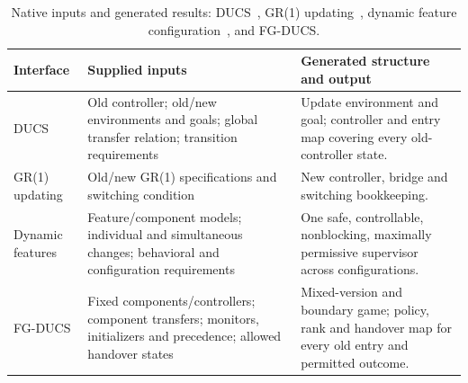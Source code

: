 \begin{table}[!htbp]
\caption{Native inputs and generated results: DUCS~\cite[Defs.~4.1--4.3, Sec.~5]{Nahabedian2020}, GR(1) updating~\cite[Def.~3.1, Sec.~4]{Amram2022GR1DynamicUpdate}, dynamic feature configuration~\cite[Secs.~4--7]{ThuijsmanReniers2024DynamicFeature}, and FG-DUCS.}
\label{tab:contract-workflow}
\centering\small\setlength{\tabcolsep}{4pt}
\begin{tabular}{@{}>{\raggedright\arraybackslash}p{.16\linewidth}>{\raggedright\arraybackslash}p{.38\linewidth}>{\raggedright\arraybackslash}p{.41\linewidth}@{}}\toprule
Interface & Supplied inputs & Generated structure and output\\\midrule
DUCS
& Old controller; old/new environments and goals; global transfer relation; transition requirements
& Update environment and goal; controller and entry map covering every old-controller state.\\\addlinespace
GR(1) updating
& Old/new GR(1) specifications and switching condition
& New controller, bridge and switching bookkeeping.\\\addlinespace
Dynamic features
& Feature/component models; individual and simultaneous changes; behavioral and configuration requirements
& One safe, controllable, nonblocking, maximally permissive supervisor across configurations.\\\addlinespace
FG-DUCS
& Fixed components/controllers; component transfers; monitors, initializers and precedence; allowed handover states
& Mixed-version and boundary game; policy, rank and handover map for every old entry and permitted outcome.\\\bottomrule
\end{tabular}
\end{table}
